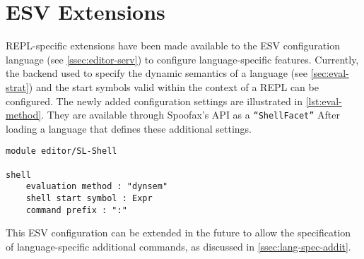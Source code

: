 \section{ESV Extensions}
\label{sec:esv-extensions}

REPL-specific extensions have been made available to the ESV configuration
language (see \cref{ssec:editor-serv}) to configure language-specific
features. Currently, the backend used to specify the dynamic semantics of a
language (see \cref{sec:eval-strat}) and the start symbols valid within the
context of a REPL can be configured. The newly added configuration settings are
illustrated in \cref{lst:eval-method}. They are available through Spoofax's API
as a \texttt{``ShellFacet''} After loading a language that defines
these additional settings.

\begin{lstlisting}[language=esv,caption={Configuring language specific settings.},label={lst:eval-method}]
module editor/SL-Shell

shell
    evaluation method : "dynsem"
    shell start symbol : Expr
    command prefix : ":"
\end{lstlisting}

This ESV configuration can be extended in the future to allow the specification
of language-specific additional commands, as discussed in
\cref{ssec:lang-spec-addit}.

